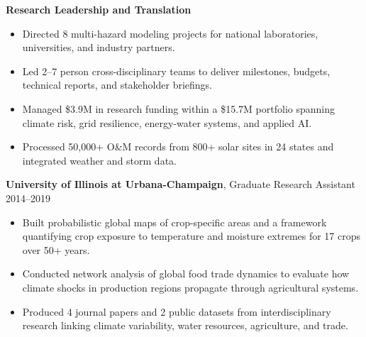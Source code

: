 \documentclass{article}[12pt]
\begin{document}
	\vspace{0.5em}
	\noindent
	\textbf{Research Leadership and Translation}
	\begin{itemize}[leftmargin=*]
		\itemsep0em
		\item Directed 8 multi-hazard modeling projects for national laboratories, universities, and industry partners.
		\item Led 2--7 person cross-disciplinary teams to deliver milestones, budgets, technical reports, and stakeholder briefings.
		\item Managed \$3.9M in research funding within a \$15.7M portfolio spanning climate risk, grid resilience, energy-water systems, and applied AI.
		\item Processed 50{,}000+ O\&M records from 800+ solar sites in 24 states and  integrated weather and storm data.
	\end{itemize}
	
	\vspace{0.5em}
	\noindent
	\textbf{University of Illinois at Urbana-Champaign}, Graduate Research Assistant \hfill 2014--2019
	\begin{itemize}[leftmargin=*]
		\itemsep0em
		\item Built probabilistic global maps of crop-specific areas and a framework quantifying crop exposure to temperature and moisture extremes for 17 crops over 50+ years.
		\item Conducted network analysis of global food trade dynamics to evaluate how climate shocks in production regions propagate through agricultural systems.
		\item Produced 4 journal papers and 2 public datasets from interdisciplinary research linking climate variability, water resources, agriculture, and trade.
	\end{itemize}
	
	\vspace{-1em}
\end{document}
